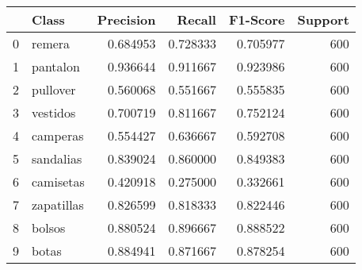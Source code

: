\begin{tabular}{llrrrr}
\toprule
 & Class & Precision & Recall & F1-Score & Support \\
\midrule
0 & remera & 0.684953 & 0.728333 & 0.705977 & 600 \\
1 & pantalon & 0.936644 & 0.911667 & 0.923986 & 600 \\
2 & pullover & 0.560068 & 0.551667 & 0.555835 & 600 \\
3 & vestidos & 0.700719 & 0.811667 & 0.752124 & 600 \\
4 & camperas & 0.554427 & 0.636667 & 0.592708 & 600 \\
5 & sandalias & 0.839024 & 0.860000 & 0.849383 & 600 \\
6 & camisetas & 0.420918 & 0.275000 & 0.332661 & 600 \\
7 & zapatillas & 0.826599 & 0.818333 & 0.822446 & 600 \\
8 & bolsos & 0.880524 & 0.896667 & 0.888522 & 600 \\
9 & botas & 0.884941 & 0.871667 & 0.878254 & 600 \\
\bottomrule
\end{tabular}
